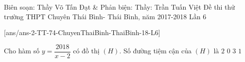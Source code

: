 \begin{name}
{Biên soạn: Thầy Võ Tấn Đạt \& Phản biện: Thầy: Trần Tuấn Việt }
{Đề thi thử trường THPT Chuyên Thái Bình- Thái Bình, năm 2017-2018 Lần 6}
\end{name}
\setcounter{ex}{0}\setcounter{bt}{0}
[ans/ans-2-TT-74-ChuyenThaiBinh-ThaiBinh-18-L6]
\begin{ex}%
	Cho hàm số $y=\dfrac{2018}{x-2}$ có đồ thị $(H)$. Số đường tiệm cận của $(H)$ là 
	\choice
	{\True $2$}
	{$0$}
	{$3$}
	{$1$}
\end{ex}

